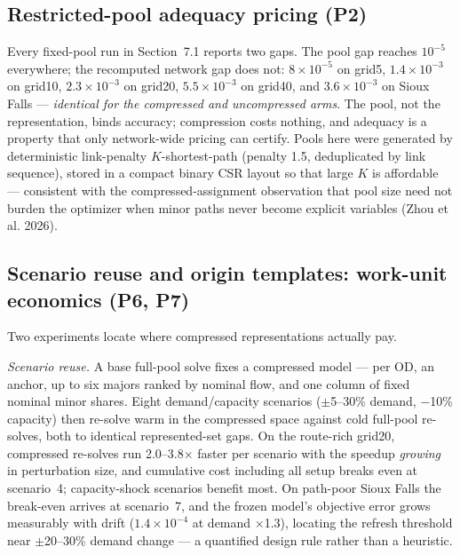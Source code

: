 \documentclass[11pt]{article}
\newcommand{\citepara}[1]{(#1)}
\begin{document}
\subsection{Restricted-pool adequacy pricing (P2)}
Every fixed-pool run in Section~7.1 reports two gaps. The pool gap reaches
$10^{-5}$ everywhere; the recomputed network gap does not: $8\times10^{-5}$
on grid5, $1.4\times10^{-3}$ on grid10, $2.3\times10^{-3}$ on grid20,
$5.5\times10^{-3}$ on grid40, and $3.6\times10^{-3}$ on Sioux Falls ---
\emph{identical for the compressed and uncompressed arms}. The pool, not
the representation, binds accuracy; compression costs nothing, and
adequacy is a property that only network-wide pricing can certify. Pools
here were generated by deterministic link-penalty $K$-shortest-path
(penalty 1.5, deduplicated by link sequence), stored in a compact binary
CSR layout so that large $K$ is affordable --- consistent with the
compressed-assignment observation that pool size need not burden the
optimizer when minor paths never become explicit variables
\citepara{Zhou et al. 2026}.

\subsection{Scenario reuse and origin templates: work-unit economics (P6,
P7)}
Two experiments locate where compressed representations actually pay.

\emph{Scenario reuse.} A base full-pool solve fixes a compressed model ---
per OD, an anchor, up to six majors ranked by nominal flow, and one column
of fixed nominal minor shares. Eight demand/capacity scenarios
($\pm$5--30\% demand, $-$10\% capacity) then re-solve warm in the
compressed space against cold full-pool re-solves, both to identical
represented-set gaps. On the route-rich grid20, compressed re-solves run
2.0--3.8$\times$ faster per scenario with the speedup \emph{growing} in
perturbation size, and cumulative cost including all setup breaks even at
scenario~4; capacity-shock scenarios benefit most. On path-poor Sioux
Falls the break-even arrives at scenario~7, and the frozen model's
objective error grows measurably with drift ($1.4\times10^{-4}$ at demand
$\times$1.3), locating the refresh threshold near $\pm$20--30\% demand
change --- a quantified design rule rather than a heuristic.
\end{document}

